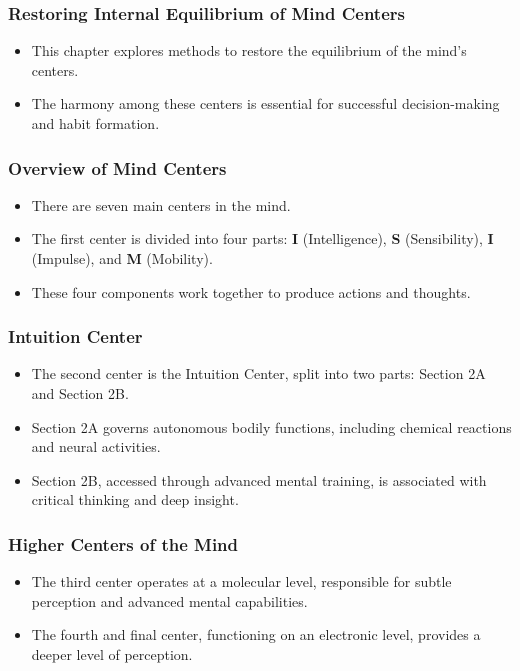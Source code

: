 \begin{frame}[fragile]\frametitle{Restoring Internal Equilibrium of Mind Centers}
    \begin{itemize}
        \item This chapter explores methods to restore the equilibrium of the mind’s centers.
        \item The harmony among these centers is essential for successful decision-making and habit formation.
    \end{itemize}
\end{frame}

\begin{frame}[fragile]\frametitle{Overview of Mind Centers}
    \begin{itemize}
        \item There are seven main centers in the mind.
        \item The first center is divided into four parts: \textbf{I} (Intelligence), \textbf{S} (Sensibility), \textbf{I} (Impulse), and \textbf{M} (Mobility).
        \item These four components work together to produce actions and thoughts.
    \end{itemize}
\end{frame}

\begin{frame}[fragile]\frametitle{Intuition Center}
    \begin{itemize}
        \item The second center is the Intuition Center, split into two parts: Section 2A and Section 2B.
        \item Section 2A governs autonomous bodily functions, including chemical reactions and neural activities.
        \item Section 2B, accessed through advanced mental training, is associated with critical thinking and deep insight.
    \end{itemize}
\end{frame}

\begin{frame}[fragile]\frametitle{Higher Centers of the Mind}
    \begin{itemize}
        \item The third center operates at a molecular level, responsible for subtle perception and advanced mental capabilities.
        \item The fourth and final center, functioning on an electronic level, provides a deeper level of perception.
    \end{itemize}
\end{frame}

